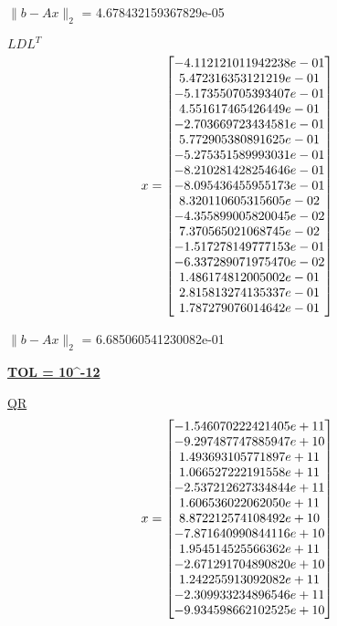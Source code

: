 \documentclass[final,12pt,reqno]{amsart}
\begin{document}
$\|b-Ax\|_2$ = 4.678432159367829e-05

\underline{$LDL^T$}
\[
x =
\left[\begin{array}{@{}*{1}{c}@{}}
		-4.112121011942238e-01\\
     5.472316353121219e-01\\
    -5.173550705393407e-01\\
     4.551617465426449e-01\\
    -2.703669723434581e-01\\
     5.772905380891625e-01\\
    -5.275351589993031e-01\\
    -8.210281428254646e-01\\
    -8.095436455955173e-01\\
     8.320110605315605e-02\\
    -4.355899005820045e-02\\
     7.370565021068745e-02\\
    -1.517278149777153e-01\\
    -6.337289071975470e-02\\
     1.486174812005002e-01\\
     2.815813274135337e-01\\
     1.787279076014642e-01
  \end{array} \right]
\]

$\|b-Ax\|_2$ = 6.685060541230082e-01

\newpage

\textbf{\underline{TOL = 10^{-12}}}

\underline{QR}
\[
x =
\left[\begin{array}{@{}*{1}{c}@{}}
    -1.546070222421405e+11\\
    -9.297487747885947e+10\\
     1.493693105771897e+11\\
     1.066527222191558e+11\\
    -2.537212627334844e+11\\
     1.606536022062050e+11\\
     8.872212574108492e+10\\
    -7.871640990844116e+10\\
     1.954514525566362e+11\\
    -2.671291704890820e+10\\
     1.242255913092082e+11\\
    -2.309933234896546e+11\\
    -9.934598662102525e+10
  \end{array} \right]
\]
\end{document}

